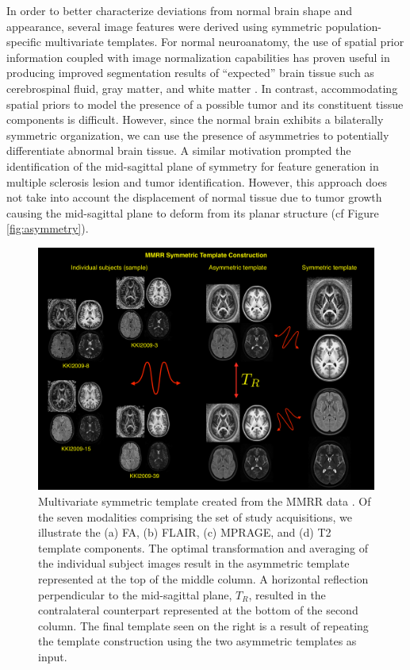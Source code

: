 \documentclass[preprint,authoryear,review,12pt]{elsarticle}
\begin{document}
In order to better characterize deviations from normal brain shape 
and appearance, several image features were derived using symmetric 
population-specific multivariate templates.  
For normal neuroanatomy, the use of spatial prior information 
coupled with image normalization capabilities has proven useful 
in producing improved segmentation results of ``expected'' brain tissue
such as cerebrospinal fluid, gray matter, and white matter 
\citep[e.g.,][]{ashburner1997}.  In contrast, accommodating spatial 
priors to model the presence of a possible tumor and its constituent tissue 
components is difficult. However, since the normal brain 
exhibits a bilaterally symmetric organization, we can 
use the presence of asymmetries to potentially differentiate abnormal 
brain tissue.  A similar motivation prompted
the identification of the mid-sagittal plane of symmetry \citep{prima2002}
for feature generation in multiple sclerosis lesion \citep{geremia2011} and 
tumor \citep{geremia2012} identification.  However, this
approach does not take into account the displacement of 
normal tissue due to tumor growth causing the mid-sagittal plane
to deform from its planar structure (cf Figure \ref{fig:asymmetry}).


\begin{figure}[h]
    \centerline{\includegraphics[width=130mm]{Figures/templateKirby.pdf}}
  \caption{Multivariate symmetric template created from the MMRR 
           data \citep{landman2011}.  Of the seven modalities 
           comprising the set of study acquisitions, we illustrate the
           (a) FA, (b) FLAIR, (c) MPRAGE, and (d) T2 template components.
           The optimal transformation and averaging of the individual 
           subject images result in the asymmetric template represented at 
           the top of the middle column.  A horizontal reflection 
           perpendicular to the mid-sagittal
           plane, $T_R$, resulted in the contralateral counterpart represented
           at the bottom of the second column.  The final template seen on
           the right is a result of repeating the template construction using
           the two asymmetric templates as input.
          }
  \label{fig:symmetrictemplates}
\end{figure}
\end{document}
